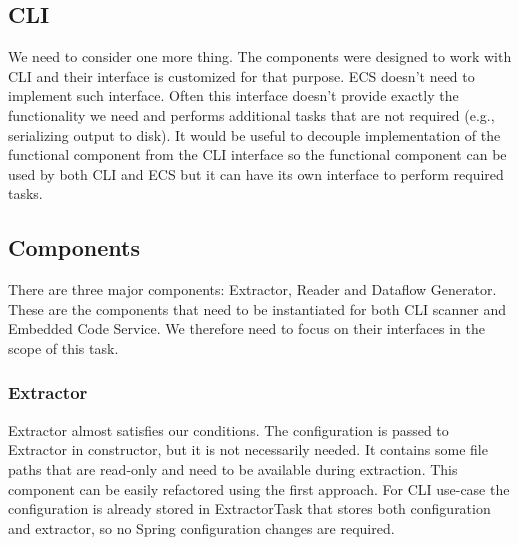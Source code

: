 \subsection{CLI}
We need to consider one more thing. The components were designed to work with CLI and their interface is customized for that purpose. ECS doesn’t need to implement such interface. Often this interface doesn’t provide exactly the functionality we need and performs additional tasks that are not required (e.g., serializing output to disk). It would be useful to decouple implementation of the functional component from the CLI interface so the functional component can be used by both CLI and ECS but it can have its own interface to perform required tasks.

\subsection{Components}
There are three major components: Extractor, Reader and Dataflow Generator. These are the components that need to be instantiated for both CLI scanner and Embedded Code Service. We therefore need to focus on their interfaces in the scope of this task.

\subsubsection{Extractor}
Extractor almost satisfies our conditions. The configuration is passed to Extractor in constructor, but it is not necessarily needed. It contains some file paths that are read-only and need to be available during extraction. This component can be easily refactored using the first approach. For CLI use-case the configuration is already stored in ExtractorTask that stores both configuration and extractor, so no Spring configuration changes are required.

